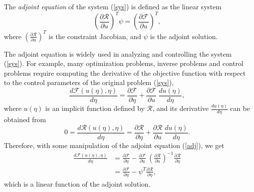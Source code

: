     The \emph{adjoint equation} of the system (\ref{sys}) is defined as the
    linear system
    \begin{equation} \label{adj}
          \left( \frac{\partial\mathcal{R}}{\partial u} \right)^T \psi
        = \left( \frac{\partial\mathcal{F}}{\partial u} \right)^T ,
    \end{equation}
    where $\left( \frac{\partial\mathcal{R}}{\partial u} \right)^T$ is the
    constraint Jacobian, and $\psi$ is the adjoint solution.
    
    The adjoint equation is widely used in analyzing and
    controlling the system (\ref{sys}).  For example, many
    optimization problems, inverse problems and control problems require
    computing the derivative of the objective function with respect to
    the control parameters of the original problem (\ref{sys}),
    \[ \frac{d\mathcal{F}(u(\eta),\eta)}{d\eta}
        = \frac{\partial \mathcal{F}}{\partial \eta} +
          \frac{\partial \mathcal{F}}{\partial u} \: \frac{d u(\eta)}{d \eta},
    \]
    where $u(\eta)$ is an implicit function defined by $\mathcal{R}$, and its
    derivative
    $\frac{d u(\eta)}{d \eta}$ can be obtained from
    \[ 0 = \frac{d\mathcal{R}(u(\eta),\eta)}{d\eta}
         = \frac{\partial \mathcal{R}}{\partial \eta} +
           \frac{\partial \mathcal{R}}{\partial u} \: \frac{d u(\eta)}{d \eta}.
    \]
    Therefore, with some manipulation of the adjoint equation (\ref{adj}),
    we get
    \begin{equation}\label{impder} \begin{split}
        \frac{d\mathcal{F}(u(\eta),\eta)}{d\eta}
        &= \frac{\partial \mathcal{F}}{\partial \eta} -
           \frac{\partial \mathcal{F}}{\partial u} \:
           \left( \frac{\partial \mathcal{R}}{\partial u} \right)^{-1}
           \frac{\partial \mathcal{R}}{\partial \eta} \\
        &= \frac{\partial \mathcal{F}}{\partial \eta} -
           \psi^T \frac{\partial \mathcal{R}}{\partial \eta} ,
    \end{split} \end{equation}
    which is a linear function of the adjoint solution.
    
